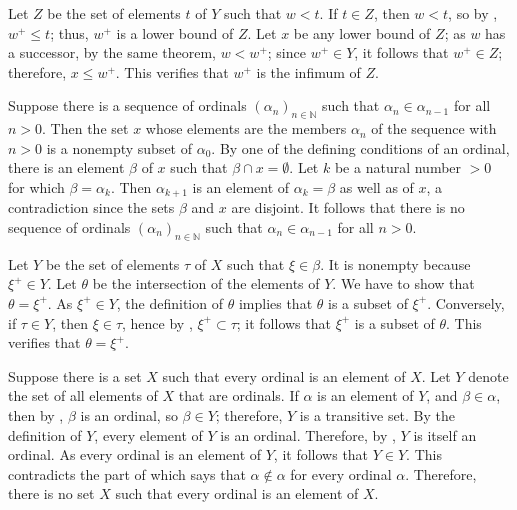 \documentclass{article}
\begin{document}
\begin{solution}[\ref{exe:ylp1zcc8}]
  \label{sol:6szduuuo}
  Let \(Z\) be the set of elements \(t\) of \(Y\) such that \(w < t\).
  If \(t \in Z\), then \(w < t\), so by ,
  \(w^+ \leq t\); thus, \(w^+\) is a lower bound of \(Z\).  Let \(x\)
  be any lower bound of \(Z\); as \(w\) has a successor, by the same
  theorem, \(w < w^+\); since \(w^+ \in Y\), it follows that
  \(w^+ \in Z\); therefore, \(x \leq w^+\).  This verifies that
  \(w^+\) is the infimum of \(Z\).
\end{solution}

\begin{solution}[\ref{exe:p8w4gyx9}]
  \label{sol:r63383in}
  Suppose there is a sequence of ordinals
  \((\alpha_n)_{n \in \mathbb{N}}\) such that
  \(\alpha_n \in \alpha_{n-1}\) for all \(n > 0\).  Then the set \(x\)
  whose elements are the members \(\alpha_n\) of the sequence with
  \(n > 0\) is a nonempty subset of \(\alpha_0\).  By one of the
  defining conditions of an ordinal, there is an element \(\beta\) of
  \(x\) such that \(\beta \cap x = \emptyset\).  Let \(k\) be a
  natural number \(> 0\) for which \(\beta = \alpha_k\).  Then
  \(\alpha_{k+1}\) is an element of \(\alpha_k = \beta\) as well as of
  \(x\), a contradiction since the sets \(\beta\) and \(x\) are
  disjoint.  It follows that there is no sequence of ordinals
  \((\alpha_n)_{n \in \mathbb{N}}\) such that
  \(\alpha_n \in \alpha_{n-1}\) for all \(n > 0\).
\end{solution}

\begin{solution}[\ref{exe:ddc4bdfk}]
  \label{sol:knjkxl0v}
  Let \(Y\) be the set of elements \(\tau\) of \(X\) such that
  \(\xi \in \beta\).  It is nonempty because \(\xi^+ \in Y\).  Let
  \(\theta\) be the intersection of the elements of \(Y\).  We have to
  show that \(\theta = \xi^+\).  As \(\xi^+ \in Y\), the definition of
  \(\theta\) implies that \(\theta\) is a subset of \(\xi^+\).
  Conversely, if \(\tau \in Y\), then \(\xi \in \tau\), hence by
  , \(\xi^+ \subset \tau\); it follows that
  \(\xi^+\) is a subset of \(\theta\).  This verifies that
  \(\theta = \xi^+\).
\end{solution}

\begin{solution}[\ref{exe:9pk4eh7k}]
  \label{sol:s4fkzn20}
  Suppose there is a set \(X\) such that every ordinal is an element
  of \(X\).  Let \(Y\) denote the set of all elements of \(X\) that
  are ordinals.  If \(\alpha\) is an element of \(Y\), and
  \(\beta \in \alpha\), then by , \(\beta\) is an
  ordinal, so \(\beta \in Y\); therefore, \(Y\) is a transitive set.
  By the definition of \(Y\), every element of \(Y\) is an ordinal.
  Therefore, by , \(Y\) is itself an ordinal.  As
  every ordinal is an element of \(Y\), it follows that \(Y \in Y\).
  This contradicts the part of  which says that
  \(\alpha \notin \alpha\) for every ordinal \(\alpha\).  Therefore,
  there is no set \(X\) such that every ordinal is an element of
  \(X\).
\end{solution}
\end{document}
